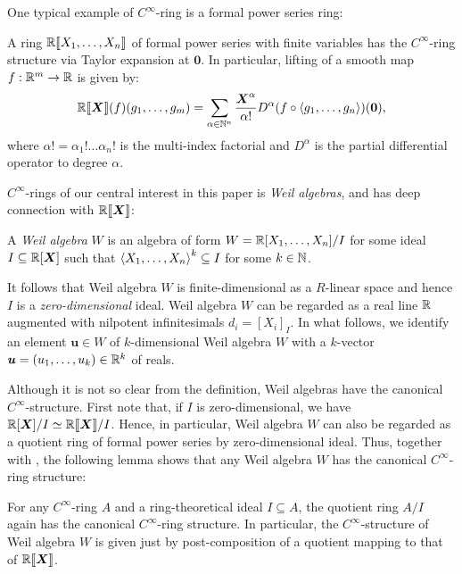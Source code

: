 \documentclass[%
  sigconf,authorversion,screen]{acmart}
\begin{document}
One typical example of $C^\infty$-ring is a formal power series ring:

\begin{theorem}[Lawvere]\label{thm:series-is-smooth}
  A ring $\mathbb{R}\llbracket X_1, \dots, X_n\rrbracket$ of formal power series with finite variables has the $C^\infty$-ring structure via Taylor expansion at $\boldsymbol{0}$.
  In particular, lifting of a smooth map $f: \mathbb{R}^m \to \mathbb{R}$ is given by:
  \[
    \mathord{\mathbb{R}\llbracket\boldsymbol{X}\rrbracket}(f)(g_1, \dots, g_m) = \sum_{\alpha \in \mathbb{N}^n} \frac{\boldsymbol{X}^\alpha}{\alpha!} D^\alpha(f \circ \braket{g_1, \dots, g_n})(\boldsymbol{0}),
  \]
  where $\alpha! = \alpha_1 ! \dots \alpha_n !$ is the multi-index factorial and $D^\alpha$ is the partial differential operator to degree $\alpha$.
\end{theorem}

$C^\infty$-rings of our central interest in this paper is \emph{Weil algebras}, and has deep connection with $\mathord{\mathbb{R}\llbracket\boldsymbol{X}\rrbracket}$:

\begin{definition}
  A \emph{Weil algebra} $W$ is an algebra of form $W = \mathbb{R}[X_1, \dots, X_n]/I$ for some ideal $I \subseteq \mathbb{R}[\boldsymbol{X}]$ such that $\braket{X_1, \dots, X_n}^k \subseteq I$ for some $k \in \mathbb{N}$.
\end{definition}
It follows that Weil algebra $W$ is finite-dimensional as a $R$-linear space and hence $I$ is a \emph{zero-dimensional} ideal.
Weil algebra $W$ can be regarded as a real line $\mathbb{R}$ augmented with nilpotent infinitesimals $d_i = {[X_i]}_I$.
In what follows, we identify an element $\boldsymbol{u} \in W$ of $k$-dimensional Weil algebra $W$ with a $k$-vector $\boldsymbol{u} = (u_1, \dots, u_k) \in \mathbb{R}^k$ of reals.

Although it is not so clear from the definition, Weil algebras have the canonical $C^\infty$-structure.
First note that, if $I$ is zero-dimensional, we have $\mathbb{R}[\boldsymbol{X}]/I \simeq \mathbb{R}\llbracket \boldsymbol{X} \rrbracket /I$.
Hence, in particular, Weil algebra $W$ can also be regarded as a quotient ring of formal power series by zero-dimensional ideal.
Thus, together with , the following lemma shows that any Weil algebra $W$ has the canonical $C^\infty$-ring structure:

\begin{lemma}\label{lem:quot-ring-ideal}
  For any $C^\infty$-ring $A$ and a ring-theoretical ideal $I \subseteq A$, the quotient ring $A/I$ again has the canonical $C^\infty$-ring structure.
  In particular, the $C^\infty$-structure of Weil algebra $W$ is given just by post-composition of a quotient mapping to that of $\mathord{\mathbb{R}\llbracket\boldsymbol{X}\rrbracket}$.
\end{lemma}
\end{document}
